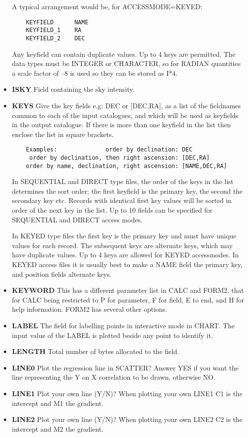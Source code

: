 \begin{itemize}
A typical arrangement would be, for ACCESSMODE=KEYED:
\begin{verbatim}
    KEYFIELD      NAME
    KEYFIELD_1    RA
    KEYFIELD_2    DEC
\end{verbatim}
Any keyfield can contain duplicate values.
Up to 4 keys are permitted.
The data types must be INTEGER or CHARACTER, so for RADIAN quantities a scale
factor of --8 is used so they can be stored as I*4.
\item{\bf ISKY} Field containing the sky intensity.
\item{\bf KEYS} Give the key fields e.g: DEC or [DEC,RA], as a list of the
fieldnames common to each of the input catalogues, and which will be used
as keyfields in the output catalogue.
If there is more than one keyfield in the list then enclose the list in
square brackets.
\begin{verbatim}
    Examples:              order by declination: DEC
     order by declination, then right ascension: [DEC,RA]
    order by name, declination, right ascension: [NAME,DEC,RA]
\end{verbatim}
In SEQUENTIAL and DIRECT type files, the order of the keys in the list
determines the sort order; the first keyfield is the primary key, the
second the secondary key etc.
Records with identical first key values will be sorted in order of the next
key in the list.
Up to 10 fields can be specified for SEQUENTIAL and DIRECT access modes.

In KEYED type files the first key is the primary key and must have unique
values for each record.
The subsequent keys are alternate keys, which may have duplicate values.
Up to 4 keys are allowed for KEYED accessmodes.
In KEYED access files it is usually best to make a NAME field the primary
key, and position fields alternate keys.
\item{\bf KEYWORD} This has a different parameter list in CALC and FORM2,
that for CALC being restricted to P for parameter, F for field, E to end,
and H for help information.
FORM2 has several other options.
\item{\bf LABEL} The field for labelling points in interactive mode in CHART.
The input value of the LABEL is plotted beside any point to identify it.
\item{\bf LENGTH} Total number of bytes allocated to the field.
\item{\bf LINE0} Plot the regression line in SCATTER?
Answer YES if you want the line representing the Y on X correlation to be
drawn, otherwise NO.
\item{\bf LINE1} Plot your own line (Y/N)? When plotting your own LINE1 C1
is the intercept and M1 the gradient.
\item{\bf LINE2} Plot your own line (Y/N)? When plotting your own LINE2 C2
is the intercept and M2 the gradient.


\end{itemize}
